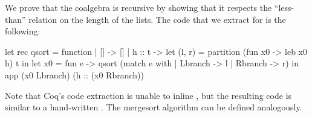 \documentclass{llncs}
\begin{document}
We prove that the coalgebra  is recursive by showing
that it respects the ``less-than'' relation on the length of the lists.
%
The code that we extract for  is the following:
\begin{ocamlcode}
let rec qsort = function
| [] -> [] | h :: t ->
  let (l, r) = partition (fun x0 -> leb x0 h) t in
  let x0 = fun e -> qsort (match e with | Lbranch -> l | Rbranch -> r) in
  app (x0 Lbranch) (h :: (x0 Rbranch))
\end{ocamlcode}
Note that Coq's code extraction is unable to inline , but the resulting
code is similar to a hand-written .
The mergesort algorithm can be defined analogously.



\end{document}
